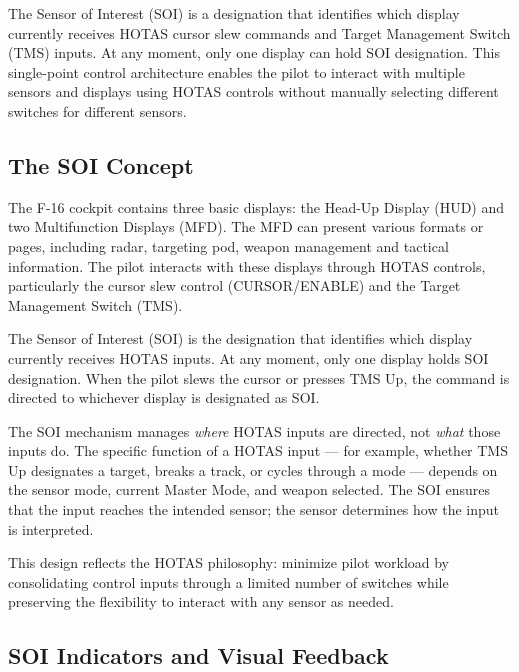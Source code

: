 \documentclass[11pt, a4paper, twoside]{report}
\begin{document}
The Sensor of Interest (SOI) is a designation that identifies which display currently receives HOTAS cursor slew commands and Target Management Switch (TMS) inputs. At any moment, only one display can hold SOI designation. This single-point control architecture enables the pilot to interact with multiple sensors and displays using HOTAS controls without manually selecting different switches for different sensors.

\subsection{The SOI Concept}
\label{sec:C2-S1-S1}

The F-16 cockpit contains three basic displays: the Head-Up Display (HUD) and two Multifunction Displays (MFD). The MFD can present various formats or pages, including radar, targeting pod, weapon management and tactical information. The pilot interacts with these displays through HOTAS controls, particularly the cursor slew control (CURSOR/ENABLE) and the Target Management Switch (TMS).

The Sensor of Interest (SOI) is the designation that identifies which display currently receives HOTAS inputs. At any moment, only one display holds SOI designation. When the pilot slews the cursor or presses TMS Up, the command is directed to whichever display is designated as SOI.

The SOI mechanism manages \textit{where} HOTAS inputs are directed, not \textit{what} those inputs do. The specific function of a HOTAS input — for example, whether TMS Up designates a target, breaks a track, or cycles through a mode — depends on the sensor mode, current Master Mode, and weapon selected. The SOI ensures that the input reaches the intended sensor; the sensor determines how the input is interpreted.

This design reflects the HOTAS philosophy: minimize pilot workload by consolidating control inputs through a limited number of switches while preserving the flexibility to interact with any sensor as needed.

\subsection{SOI Indicators and Visual Feedback}
\label{sec:C2-S1-S2}
\end{document}
